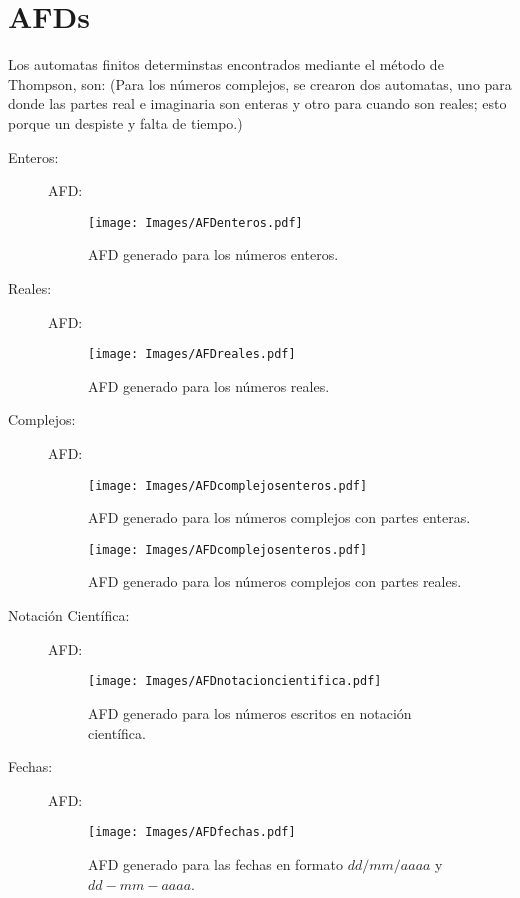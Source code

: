 \section{AFDs}
Los automatas finitos determinstas encontrados mediante el método de Thompson, son: (Para los números complejos, se crearon dos automatas, uno para donde las partes real e imaginaria son enteras y otro para cuando son reales; esto porque un despiste y falta de tiempo.)
\begin{multicols}{2}
\begin{description}
	\item[Enteros: ] AFD:
		\begin{figure}[H]
			\centering
			\texttt{[image: Images/AFDenteros.pdf]}
			\caption{AFD generado para los números enteros.}
			\label{fig:enteros}
		\end{figure}
	\item[Reales: ] AFD:
		\begin{figure}[H]
			\centering
			\texttt{[image: Images/AFDreales.pdf]}
			\caption{AFD generado para los números reales.}
			\label{fig:reales}
		\end{figure}
	\item[Complejos: ] AFD:
		\begin{figure}[H]
			\centering
			\texttt{[image: Images/AFDcomplejosenteros.pdf]}
			\caption{AFD generado para los números complejos con partes enteras.}
			\label{fig:complejose}
		\end{figure}
		\begin{figure}[H]
			\centering
			\texttt{[image: Images/AFDcomplejosenteros.pdf]}
			\caption{AFD generado para los números complejos con partes reales.}
			\label{fig:complejosr}
		\end{figure}
	\item[Notación Científica: ] AFD:
		\begin{figure}[H]
			\centering
			\texttt{[image: Images/AFDnotacioncientifica.pdf]}
			\caption{AFD generado para los números escritos en notación científica.}
			\label{fig:notacioncientifica}
		\end{figure}
	\item[Fechas: ] AFD:
		\begin{figure}[H]
			\centering
			\texttt{[image: Images/AFDfechas.pdf]}
			\caption{AFD generado para las fechas en formato $dd/mm/aaaa$ y $dd-mm-aaaa$.}
			\label{fig:fechas}
		\end{figure}
\end{description}
\end{multicols}







